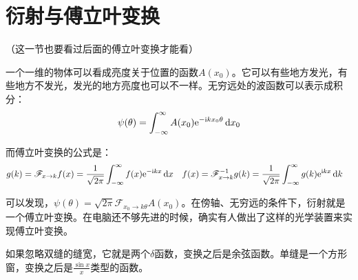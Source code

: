 \section{衍射与傅立叶变换}
（这一节也要看过后面的傅立叶变换才能看）

一个一维的物体可以看成亮度关于位置的函数$A(x_0)$。它可以有些地方发光，有些地方不发光，发光的地方亮度也可以不一样。无穷远处的波函数可以表示成积分：
\begin{equation*}
\psi(\theta)=\int_{-\infty}^{\infty} A(x_0) \mathrm{e}^{-\mathrm{i} k x_0 \theta} \mathop{}\!\mathrm{d} x_0
\end{equation*}

而傅立叶变换的公式是：
\begin{align*}
g(k)&=\mathscr{F}_{x \rightarrow k} f(x)=\frac{1}{\sqrt{2 \pi}} \int_{-\infty}^{\infty} f(x) \mathrm{e}^{-\mathrm{i} k x} \mathop{}\!\mathrm{d} x &
f(x)&=\mathscr{F}^{-1}_{x \rightarrow k} g(k)=\frac{1}{\sqrt{2 \pi}} \int_{-\infty}^{\infty} g(k) \mathrm{e}^{\mathrm{i} k x} \mathop{}\!\mathrm{d} k
\end{align*}

可以发现，$\psi(\theta)=\sqrt{2 \pi} \mathscr{F}_{x_0 \rightarrow k \theta} A(x_0)$。在傍轴、无穷远的条件下，衍射就是一个傅立叶变换。在电脑还不够先进的时候，确实有人做出了这样的光学装置来实现傅立叶变换。

如果忽略双缝的缝宽，它就是两个$\delta$函数，变换之后是余弦函数。单缝是一个方形窗，变换之后是$\frac{\sin x}{x}$类型的函数。
